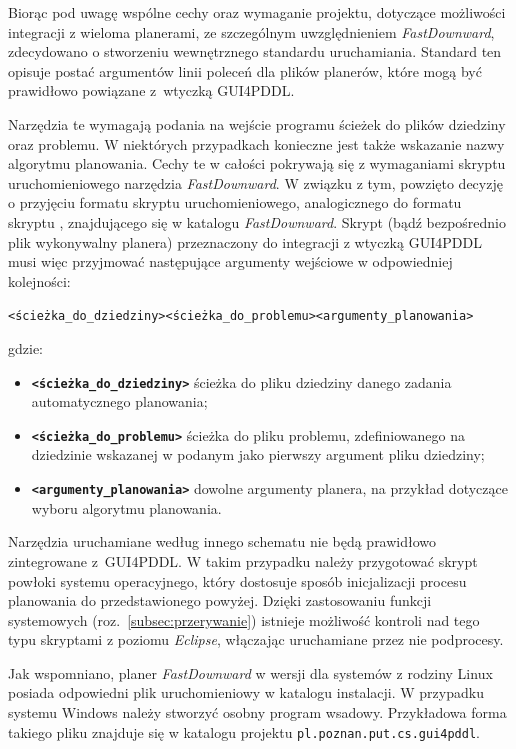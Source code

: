 Biorąc pod uwagę wspólne cechy oraz wymaganie projektu, dotyczące możliwości integracji z wieloma planerami, ze szczególnym uwzględnieniem \emph{FastDownward}, zdecydowano o stworzeniu wewnętrznego standardu uruchamiania. Standard ten opisuje postać argumentów linii poleceń dla plików planerów, które mogą być prawidłowo powiązane z~wtyczką GUI4PDDL. 

Narzędzia te wymagają podania na wejście programu ścieżek do plików dziedziny oraz problemu. W niektórych przypadkach konieczne jest także wskazanie nazwy algorytmu planowania. Cechy te w całości pokrywają się z wymaganiami skryptu uruchomieniowego narzędzia \emph{FastDownward}. W związku z tym, powzięto decyzję o przyjęciu formatu skryptu uruchomieniowego, analogicznego do formatu skryptu , znajdującego się w katalogu  \emph{FastDownward}. Skrypt (bądź bezpośrednio plik wykonywalny planera) przeznaczony do integracji z wtyczką GUI4PDDL musi więc przyjmować następujące argumenty wejściowe w odpowiedniej kolejności:

\noindent
\centerline{\texttt{<ścieżka\_do\_dziedziny>}\textvisiblespace\texttt{<ścieżka\_do\_problemu>}\textvisiblespace\texttt{<argumenty\_planowania>}}


\noindent
gdzie:
\begin{itemize}
\item \textbf{\texttt{<ścieżka\_do\_dziedziny>}}  ścieżka do pliku dziedziny danego zadania automatycznego planowania;
\item \textbf{\texttt{<ścieżka\_do\_problemu>}} ścieżka do pliku problemu, zdefiniowanego na dziedzinie wskazanej w podanym jako pierwszy argument pliku dziedziny;
\item \textbf{\texttt{<argumenty\_planowania>}} dowolne argumenty planera, na przykład dotyczące wyboru algorytmu planowania.
\end{itemize}
Narzędzia uruchamiane według innego schematu nie będą prawidłowo zintegrowane z~GUI4PDDL. W takim przypadku należy przygotować skrypt powłoki systemu operacyjnego, który dostosuje sposób inicjalizacji procesu planowania do przedstawionego powyżej. Dzięki zastosowaniu funkcji systemowych (roz.~\ref{subsec:przerywanie}) istnieje możliwość kontroli nad tego typu skryptami z poziomu \emph{Eclipse}, włączając uruchamiane przez nie podprocesy.

Jak wspomniano, planer \emph{FastDownward} w wersji dla systemów z rodziny Linux posiada odpowiedni plik uruchomieniowy w katalogu  instalacji. W przypadku systemu Windows należy stworzyć osobny program wsadowy. Przykładowa forma takiego pliku znajduje się w katalogu  projektu \texttt{pl.poznan.put.cs.gui4pddl}.

